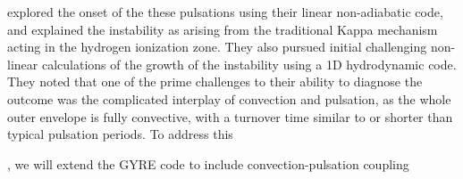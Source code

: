 \citet{1997AampA...327..224H} explored the onset of the these pulsations using
their linear non-adiabatic code, and explained the instability 
as arising from the traditional Kappa mechanism acting in the
hydrogen ionization zone. They also pursued initial challenging
non-linear calculations of the growth of the instability using a 1D 
hydrodynamic code. They noted that one of the prime challenges to
their ability to diagnose the outcome was the complicated interplay of
convection and pulsation, as the whole outer envelope is fully
convective, with a turnover time similar to or shorter than typical pulsation periods. To address this 

, we will extend the GYRE code to include convection-pulsation coupling 
